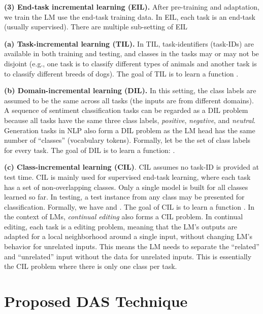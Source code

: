 \documentclass{article} \usepackage{iclr2023_conference,times}
\newcommand{\zixuan}[1]{{\color{red}{\small\bf\sf [zixuan: #1]}}}
\begin{document}
{\textbf{(3) End-task incremental learning (EIL).} After pre-training and adaptation, we train the LM use the end-task training data. In EIL, each task is an end-task (usually supervised). There are multiple sub-setting of EIL

\textbf{(a) Task-incremental learning (TIL).} In TIL, task-identifiers (task-IDs) are available in both training and testing, and classes in the tasks may or may not be disjoint (e.g., one task is to classify different types of animals and another task is to classify different breeds of dogs). The goal of TIL is to learn a function .

\textbf{(b) Domain-incremental learning (DIL).} In this setting, the class labels are assumed to be the same across all tasks (the inputs are from different domains). A sequence of sentiment classification tasks can be regarded as a DIL problem because all tasks have the same three class labels, \textit{positive}, \textit{negative}, and \textit{neutral}. Generation tasks in NLP also form a DIL problem as the LM head has the same number of ``classes'' (vocabulary tokens). Formally, let  be the set of class labels for every task. {The goal of DIL is to learn a function: .}



\textbf{(c) Class-incremental learning (CIL)}. CIL assumes no task-ID is provided at test time. CIL is mainly used for supervised end-task learning, where each task has a set of non-overlapping classes. Only a single model is built for all classes learned so far. In testing, a test instance from any class may be presented for classification. Formally, we have  and . The goal of CIL is to learn a function . 
In the context of LMs, \textit{continual editing} also forms a CIL problem. In continual editing, each task is a editing problem, meaning that the LM's outputs are adapted for a local neighborhood around a single input, without changing LM's behavior for unrelated inputs. This means the LM needs to separate the ``related'' and ``unrelated'' input without the data for unrelated inputs. This is essentially the CIL problem where there is only one class per task.



\zixuan{I put all related work to the appendix}
}
\fi

\section{Proposed DAS Technique}
\label{Sec: preliminary}
\end{document}
